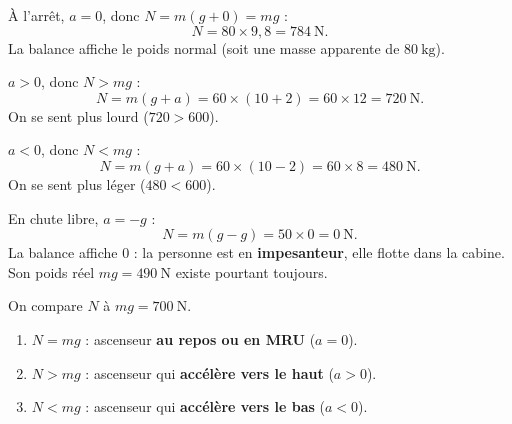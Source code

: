 \documentclass[11pt,a4paper]{article}
\begin{document}

\begin{corrige}
À l'arrêt, $a=0$, donc $N=m(g+0)=mg$ :
\[
N=80\times 9{,}8=\qty{784}{\newton}.
\]
La balance affiche le poids normal (soit une masse apparente de $\qty{80}{\kilogram}$).
\end{corrige}

\begin{corrige}
$a>0$, donc $N>mg$ :
\[
N=m(g+a)=60\times(10+2)=60\times 12=\qty{720}{\newton}.
\]
On se sent plus lourd ($720>600$).
\end{corrige}

\begin{corrige}
$a<0$, donc $N<mg$ :
\[
N=m(g+a)=60\times(10-2)=60\times 8=\qty{480}{\newton}.
\]
On se sent plus léger ($480<600$).
\end{corrige}

\begin{corrige}
En chute libre, $a=-g$ :
\[
N=m(g-g)=50\times 0=\qty{0}{\newton}.
\]
La balance affiche $0$ : la personne est en \textbf{impesanteur}, elle flotte dans la
cabine. Son poids réel $mg=\qty{490}{\newton}$ existe pourtant toujours.
\end{corrige}

\begin{corrige}
On compare $N$ à $mg=\qty{700}{\newton}$.
\begin{enumerate}[label=\alph*)]
  \item $N=mg$ : ascenseur \textbf{au repos ou en MRU} ($a=0$).
  \item $N>mg$ : ascenseur qui \textbf{accélère vers le haut} ($a>0$).
  \item $N<mg$ : ascenseur qui \textbf{accélère vers le bas} ($a<0$).
\end{enumerate}
\end{corrige}
\end{document}
